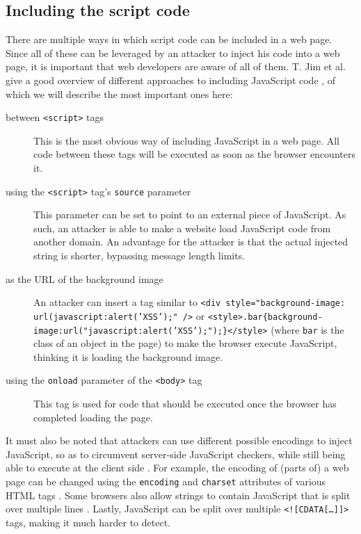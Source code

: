 \subsection{Including the script code}\label{injecting-script}
There are multiple ways in which script code can be included in a web page. Since all of these can be leveraged by an attacker to inject his code into a web page, it is important that web developers are aware of all of them. T. Jim et al. give a good overview of different approaches to including JavaScript code \cite{Jim2007}, of which we will describe the most important ones here:
\begin{description}
	\item[between \texttt{<script>} tags] This is the most obvious way of including JavaScript in a web page. All code between these tags will be executed as soon as the browser encounters it.
	\item[using the \texttt{<script>} tag's \texttt{source} parameter] This parameter can be set to point to an external piece of JavaScript. As such, an attacker is able to make a website load JavaScript code from another domain. An advantage for the attacker is that the actual injected string is shorter, bypassing message length limits.
	\item[as the URL of the background image] An attacker can insert a tag similar to \texttt{<div style="background-image: url(javascript:alert('XSS');" />} or \texttt{<style>.bar\{background-image:url("javascript:alert('XSS');");\}</style>} (where \texttt{bar} is the class of an object in the page) to make the browser execute JavaScript, thinking it is loading the background image.
	\item[using the \texttt{onload} parameter of the \texttt{<body>} tag] This tag is used for code that should be executed once the browser has completed loading the page.
\end{description}

It must also be noted that attackers can use different possible encodings to inject JavaScript, so as to circumvent server-side JavaScript checkers, while still being able to execute at the client side \cite{Jim2007}. For example, the encoding of (parts of) a web page can be changed using the \texttt{encoding} and \texttt{charset} attributes of various HTML tags \cite{Ishida2010}. Some browsers also allow strings to contain JavaScript that is split over multiple lines \cite{Jim2007}. Lastly, JavaScript can be split over multiple  \texttt{<![CDATA[\dots]]>} tags, making it much harder to detect.

